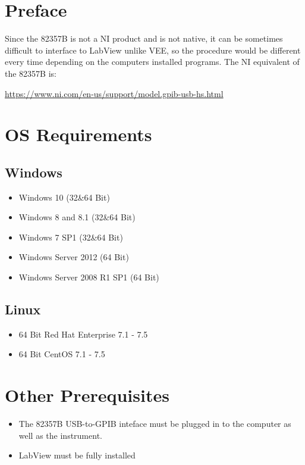 \documentclass{article}
\begin{document}
\section*{Preface}
\begin{center}
    Since the 82357B is not a NI product and is not native, it can be sometimes difficult to interface to LabView unlike VEE, so the procedure would be different every time depending on the computers installed programs. The NI equivalent of the 82357B is:
    
    \url{https://www.ni.com/en-us/support/model.gpib-usb-hs.html}
\end{center}
\section*{OS Requirements}
\subsection*{Windows}
\begin{itemize}
    \item Windows 10 (32\&64 Bit)
    \item Windows 8 and 8.1 (32\&64 Bit)
    \item Windows 7 SP1 (32\&64 Bit)
    \item Windows Server 2012 (64 Bit)
    \item Windows Server 2008 R1 SP1 (64 Bit)
\end{itemize}
\subsection*{Linux}
\begin{itemize}
    \item 64 Bit Red Hat Enterprise 7.1 - 7.5
    \item 64 Bit CentOS 7.1 - 7.5
\end{itemize}
\section*{Other Prerequisites}
\begin{itemize}
    \item The 82357B USB-to-GPIB inteface must be plugged in to the computer as well as the instrument.
    \item LabView must be fully installed
\end{itemize}
\newpage
\end{document}
